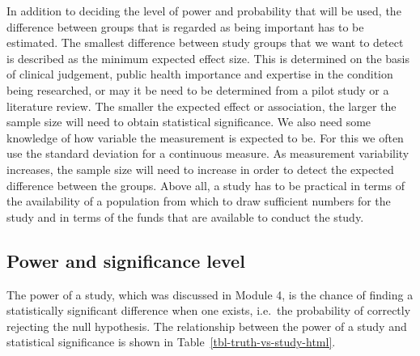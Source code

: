 \documentclass[
  a4paper,
]{memoir}
\begin{document}
In addition to deciding the level of power and probability that will be
used, the difference between groups that is regarded as being important
has to be estimated. The smallest difference between study groups that
we want to detect is described as the minimum expected effect size. This
is determined on the basis of clinical judgement, public health
importance and expertise in the condition being researched, or may it be
need to be determined from a pilot study or a literature review. The
smaller the expected effect or association, the larger the sample size
will need to obtain statistical significance. We also need some
knowledge of how variable the measurement is expected to be. For this we
often use the standard deviation for a continuous measure. As
measurement variability increases, the sample size will need to increase
in order to detect the expected difference between the groups. Above
all, a study has to be practical in terms of the availability of a
population from which to draw sufficient numbers for the study and in
terms of the funds that are available to conduct the study.

\newpage

\subsection{Power and significance
level}\label{power-and-significance-level}

The power of a study, which was discussed in Module 4, is the chance of
finding a statistically significant difference when one exists, i.e.~the
probability of correctly rejecting the null hypothesis. The relationship
between the power of a study and statistical significance is shown in
Table~\ref{tbl-truth-vs-study-html}.
\end{document}

